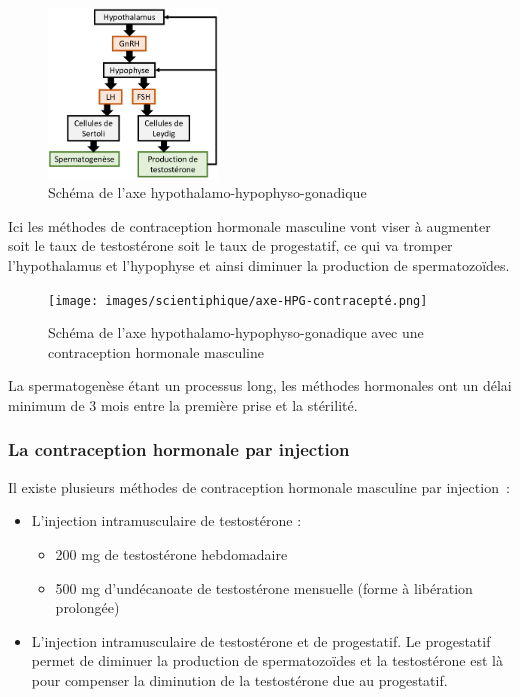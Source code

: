 \documentclass[12pt,a4paper]{report}
\begin{document}
\begin{figure}[h]
    \centering
    \includegraphics[width=0.4\textwidth]{images/scientiphique/axe-HPG.png}
    \caption{Schéma de l'axe hypothalamo-hypophyso-gonadique}
    \label{fig:axe-hypothalamo-hypophyso-gonadique}
\end{figure}

Ici les méthodes de contraception hormonale masculine vont viser à augmenter soit le taux de testostérone soit le taux de progestatif, ce qui va tromper l'hypothalamus et l'hypophyse et ainsi diminuer la production de spermatozoïdes. \cite{abbeMaleContraception2020}

\begin{figure}[h]
    \centering
    \texttt{[image: images/scientiphique/axe-HPG-contracepté.png]}
    \caption{Schéma de l'axe hypothalamo-hypophyso-gonadique avec une contraception hormonale masculine}
    \label{fig:axe-hypothalamo-hypophyso-gonadique-contracepte}
\end{figure}

La spermatogenèse étant un processus long, les méthodes hormonales ont un délai minimum de 3 mois entre la première prise et la stérilité. 

\subsubsection{La contraception hormonale par injection} \label{section:injection}

Il existe plusieurs méthodes de contraception hormonale masculine par injection :
\begin{itemize}
    \item L'injection intramusculaire de testostérone :
    \begin{itemize}
        \item 200 mg de testostérone hebdomadaire 
        \item 500 mg d’undécanoate de testostérone mensuelle (forme à libération prolongée) \cite{tcherdukianContraceptionMasculineQuelles2020}
    \end{itemize}
    \item L'injection intramusculaire de testostérone et de progestatif. Le progestatif permet de diminuer la production de spermatozoïdes et la testostérone est là pour compenser la diminution de la testostérone due au progestatif. \cite{longUpdateNovelHormonal2021}
\end{itemize}
\end{document}
